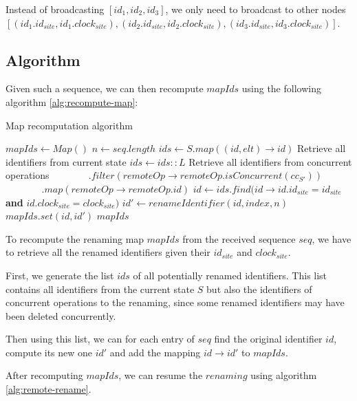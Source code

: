 \documentclass[a4paper]{article}
\begin{document}
Instead of broadcasting $[id_1, id_2, id_3]$,
we only need to broadcast to other nodes
$[(id_1.id_{site}, id_1.clock_{site}),
(id_2.id_{site}, id_2.clock_{site}),
(id_3.id_{site}, id_3.clock_{site})]$.

\subsection{Algorithm}

Given such a sequence, we can then recompute $mapIds$
using the following algorithm \ref{alg:recompute-map}:


\begin{algorithm}
  \caption{Map recomputation algorithm}
  \label{alg:recompute-map}
  \begin{algorithmic}
      \State $mapIds \gets Map()$
      \State $n \gets seq.length$
      \State $ids \gets S.map((id, elt) \to id)$
      \Comment Retrieve all identifiers from current state
      \State $ids \gets ids :: L$
      \Comment Retrieve all identifiers from concurrent operations
      \State $~~~~~~~~~~~~~~~~~.filter(remoteOp \to remoteOp.isConcurrent(cc_{S'}))$
      \State $~~~~~~~~~~~~~~~~~.map(remoteOp \to remoteOp.id)$
        \State $id \gets ids.find(id \to id.id_{site} = id_{site}$ \textbf{and} $id.clock_{site} = clock_{site})$
        \State $id' \gets renameIdentifier(id, index, n)$
        \State $mapIds.set(id, id')$
      \EndFor
      \State \Return $mapIds$
    \EndFunction
  \end{algorithmic}
\end{algorithm}

To recompute the renaming map $mapIds$ from the received sequence $seq$,
we have to retrieve all the renamed identifiers given their $id_{site}$ and
$clock_{site}$.


First, we generate the list $ids$ of all potentially renamed identifiers.
This list contains all identifiers from the current state $S$ but also the identifiers
of concurrent operations to the renaming, since some renamed identifiers may have
been deleted concurrently.


Then using this list, we can for each entry of $seq$ find the original identifier
$id$, compute its new one $id'$ and add the mapping $id \to id'$ to $mapIds$.


After recomputing $mapIds$, we can resume the $renaming$ using algorithm \ref{alg:remote-rename}.
\end{document}
